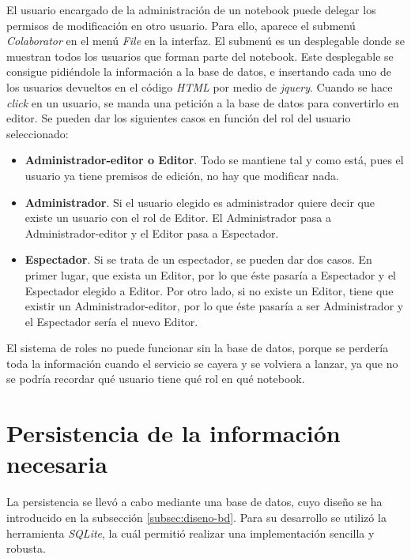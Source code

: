 \documentclass[11pt,spanish,listoffigures,listoftables]{tfgetsinf}
\begin{document}
El usuario encargado de la administración de un notebook puede delegar los permisos de modificación en otro usuario. Para ello, aparece el submenú \textit{Colaborator} en el menú \textit{File} en la interfaz. El submenú es un desplegable donde se muestran todos los usuarios que forman parte del notebook. Este desplegable se consigue pidiéndole la información a la base de datos, e insertando cada uno de los usuarios devueltos en el código \textit{HTML} por medio de \textit{jquery}. Cuando se hace \textit{click} en un usuario, se manda una petición a la base de datos para convertirlo en editor. Se pueden dar los siguientes casos en función del rol del usuario seleccionado:

\begin{itemize}

\item \textbf{Administrador-editor o Editor}. Todo se mantiene tal y como está, pues el usuario ya tiene premisos de edición, no hay que modificar nada.

\item \textbf{Administrador}. Si el usuario elegido es administrador quiere decir que existe un usuario con el rol de Editor. El Administrador pasa a Administrador-editor y el Editor pasa a Espectador.

\item \textbf{Espectador}. Si se trata de un espectador, se pueden dar dos casos. En primer lugar, que exista un Editor, por lo que éste pasaría a Espectador y el Espectador elegido a Editor. Por otro lado, si no existe un Editor, tiene que existir un Administrador-editor, por lo que éste pasaría a ser Administrador y el Espectador sería el nuevo Editor.

\end{itemize}

El sistema de roles no puede funcionar sin la base de datos, porque se perdería toda la información cuando el servicio se cayera y se volviera a lanzar, ya que no se podría recordar qué usuario tiene qué rol en qué notebook.



\section{Persistencia de la información necesaria}
\label{sec:desarrollo-persistencia}

La persistencia se llevó a cabo mediante una base de datos, cuyo diseño se ha introducido en la subsección \ref{subsec:diseno-bd}. Para su desarrollo se utilizó la herramienta \textit{SQLite}, la cuál permitió realizar una implementación sencilla y robusta. 
\end{document}
